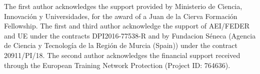 The first author acknowledges 
the support provided by Ministerio de Ciencia, Innovaci\'on y 
Universidades, for the award of a Juan de la Cierva Formaci\'on
Fellowship. The first and third author acknowledge the support of
AEI/FEDER and UE under the contracts DPI2016-77538-R and by 
Fundacion S\'eneca (Agencia de Ciencia y Tecnolog\'ia de la Regi\'on de 
Murcia (Spain)) under the contract 20911/PI/18. The second author acknowledges the financial support received through the European Training Network Protection (Project ID: 764636).
